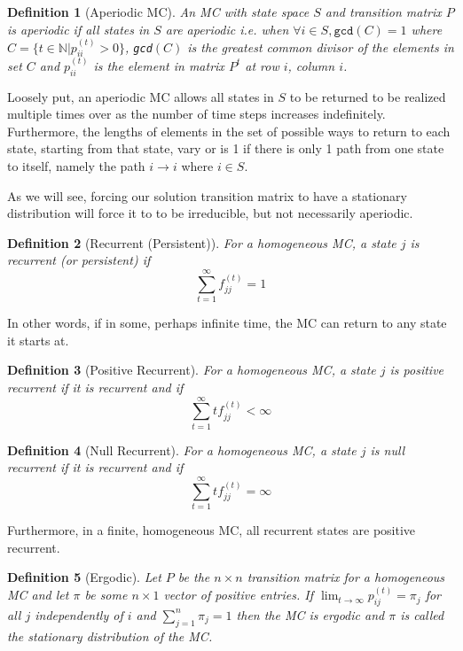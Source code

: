 \documentclass{article}
\newtheorem{defn}{Definition}
\begin{document}
\begin{defn}[Aperiodic MC]
    An MC with state space $S$ and transition matrix $P$ is aperiodic if all states in $S$ are aperiodic i.e. when $\forall i \in S, \texttt{gcd}(C) = 1$ where $C = \{t \in \mathbb{N} | p^{(t)}_{ii} > 0\}$, \texttt{gcd}$(C)$ is the greatest common divisor of the elements in set $C$ and $p^{(t)}_{ii}$ is the element in matrix $P^t$ at row $i$, column $i$. \cite{IowaThesis}
\end{defn}

Loosely put, an aperiodic MC allows all states in $S$ to be returned to be realized multiple times over as the number of time steps increases indefinitely. Furthermore, the lengths of elements in the set of possible ways to return to each state, starting from that state, vary or is 1 if there is only 1 path from one state to itself, namely the path $i \rightarrow i$ where $i \in S$.

As we will see, forcing our solution transition matrix to have a stationary distribution will force it to to be irreducible, but not necessarily aperiodic.

\begin{defn}[Recurrent (Persistent)]
    For a homogeneous MC, a state $j$ is recurrent (or persistent) if
    \[
    \sum^{\infty}_{t=1} f_{jj}^{(t)} = 1
    \]
\end{defn}

\cite{IowaThesis}

In other words, if in some, perhaps infinite time, the MC can return to any state it starts at.

\begin{defn}[Positive Recurrent]
    For a homogeneous MC, a state $j$ is positive recurrent if it is recurrent and if
    \[
    \sum^{\infty}_{t=1} tf_{jj}^{(t)} < \infty
    \]
\end{defn}

\begin{defn}[Null Recurrent]
    For a homogeneous MC, a state $j$ is null recurrent if it is recurrent and if
    \[
    \sum^{\infty}_{t=1} tf_{jj}^{(t)} = \infty
    \]
\end{defn}

\cite{IowaThesis}

Furthermore, in a finite, homogeneous MC, all recurrent states are positive recurrent. \cite{IowaThesis}

\begin{defn}[Ergodic]
    Let $P$ be the $n \times n$ transition matrix for a homogeneous MC and let $\pi$ be some $n \times 1$ vector of positive entries. If $\lim_{t\to\infty} p^{(t)}_{ij} = \pi_j$ for all $j$ independently of $i$ and $\sum^n_{j=1} \pi_j = 1$ then the MC is ergodic and $\pi$ is called the stationary distribution of the MC. \cite{IowaThesis}
\end{defn}
\end{document}
